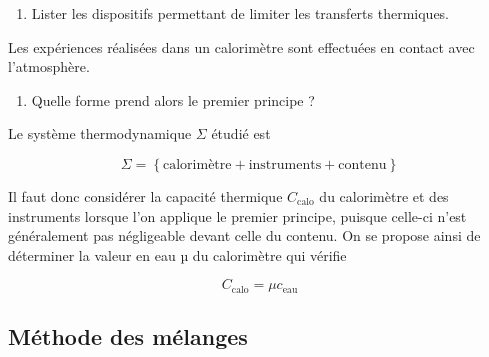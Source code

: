 \documentclass[a4paper,french,bookmarks]{article}
\begin{document}
\begin{enumerate}
    \item Lister les dispositifs permettant de limiter les transferts thermiques.
    
\end{enumerate}

Les expériences réalisées dans un calorimètre sont effectuées en contact avec l'atmosphère.

\begin{enumerate}[resume]
    \item Quelle forme prend alors le premier principe ?
    
\end{enumerate}

Le système thermodynamique $\Sigma$ étudié est

\begin{equation}
    \Sigma = \left\{\text{calorimètre} + \text{instruments} + \text{contenu}\right\}
\end{equation}

Il faut donc considérer la capacité thermique $C_\text{calo}$ du calorimètre et des instruments lorsque l'on applique le premier principe, puisque celle-ci n'est généralement pas négligeable devant celle du contenu. On se propose ainsi de déterminer la valeur en eau $µ$ du calorimètre qui vérifie

\begin{equation}
    C_\text{calo} = \mu c_\text{eau}
\end{equation}

\subsection{Méthode des mélanges}
\end{document}
